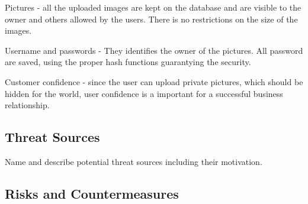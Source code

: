 Pictures - all the uploaded images are kept on the database and are visible to the owner and others allowed by the users. There is no restrictions on the size of the images.

Username and passwords - They identifies the owner of the pictures. All password are saved, using the proper hash functions guarantying the security. 

Customer confidence - since the user can upload private pictures, which should be hidden for the world, user confidence is a important for a successful business relationship.

\subsection{Threat Sources}

Name and describe potential threat sources including their motivation.

\subsection{Risks and Countermeasures}





